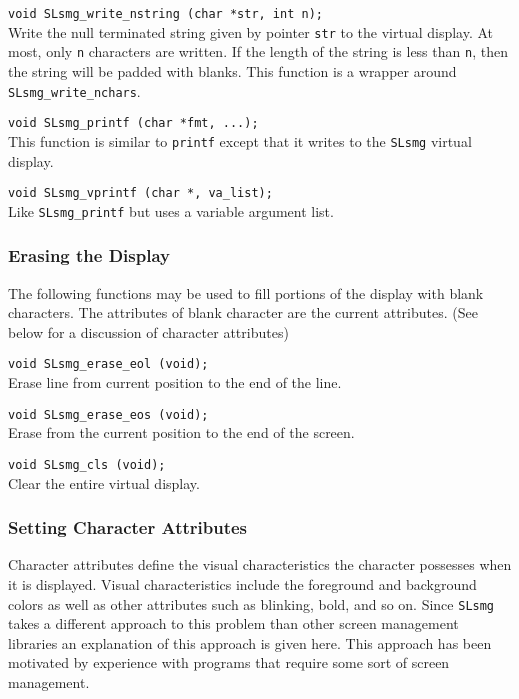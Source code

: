   \verb|void SLsmg_write_nstring (char *str, int n);|\\
  Write the null terminated string given by pointer \verb|str| to the virtual
  display.  At most, only \verb|n| characters are written.  If the length of
  the string is less than \verb|n|, then the string will be padded with blanks.
  This function is a wrapper around \verb|SLsmg_write_nchars|.
  
  \verb|void SLsmg_printf (char *fmt, ...);|\\
  This function is similar to \verb|printf| except that it writes to the
  \verb|SLsmg| virtual display.
  
  \verb|void SLsmg_vprintf (char *, va_list);|\\
  Like \verb|SLsmg_printf| but uses a variable argument list.

\subsubsection{Erasing the Display}

  The following functions may be used to fill portions of the display with
  blank characters.  The attributes of blank character are the current
  attributes.  (See below for a discussion of character attributes)
  
  \verb|void SLsmg_erase_eol (void);|\\
  Erase line from current position to the end of the line.
  
  \verb|void SLsmg_erase_eos (void);|\\
  Erase from the current position to the end of the screen.

  \verb|void SLsmg_cls (void);|\\
  Clear the entire virtual display.

\subsubsection{Setting Character Attributes}

  Character attributes define the visual characteristics the character 
  possesses when it is displayed.  Visual characteristics include the
  foreground and background colors as well as other attributes such as
  blinking, bold, and so on.  Since \verb|SLsmg| takes a different approach
  to this problem than other screen management libraries an explanation of
  this approach is given here.  This approach has been motivated by
  experience with programs that require some sort of screen management.

